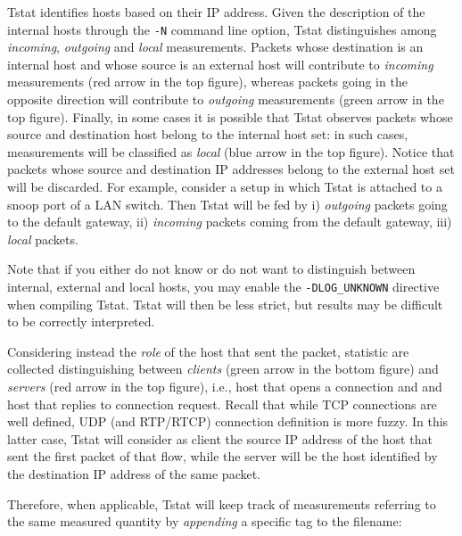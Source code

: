 \documentclass[11pt]{article}
\begin{document}
Tstat identifies hosts based on their IP address. Given the description
of the internal hosts through the \texttt{-N} command line option, Tstat
distinguishes among \textit{incoming}, \textit{outgoing} and \textit{local} 
measurements. Packets whose destination is an internal host and whose source is
an external host will contribute to \textit{incoming} measurements (red arrow in the
top figure), whereas packets going
in the opposite direction will contribute to \textit{outgoing} measurements (green
arrow in the top figure). Finally, in
some cases it is possible that Tstat observes packets whose source and
destination host belong to the internal host set: in such cases, measurements
will be classified as \textit{local} (blue arrow in the top figure).
Notice that packets whose source and destination IP
addresses belong to the external host set will be discarded.
For example, consider a setup in which Tstat is attached to a snoop port of a
LAN switch. Then Tstat will be fed by i) \textit{outgoing} packets going to the default gateway,
ii) \textit{incoming} packets coming from the default gateway, iii) \textit{local} packets.



Note that if you either do not know or do not want to distinguish between
internal, external and local hosts, you may enable the \texttt{-DLOG\_UNKNOWN}
directive when compiling Tstat. Tstat will then be less strict, but results may
be difficult to be correctly interpreted.



Considering instead the \textit{role} of the host that sent the packet, statistic are
collected distinguishing between \textit{clients} (green arrow in the bottom figure)
and \textit{servers} (red arrow in the top figure), i.e., host
that opens a connection and and host that replies to connection request. Recall
that while TCP connections are well defined, UDP (and RTP/RTCP) connection
definition is more fuzzy. In this latter case, Tstat will consider as client the
source IP address of the host that sent the first packet of that flow, while the
server will be the host identified by the destination IP address of the same
packet.



Therefore, when applicable, Tstat will keep track of measurements referring to
the same measured quantity by \textit{appending} a specific tag  to the filename:
\end{document}
